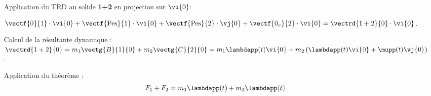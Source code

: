 \begin{corrigebox}
\vspace{.25cm}

Application du TRD au solide \textbf{1+2} en projection sur $\vi{0}$: 

$\vectf{0}{1}\cdot \vi{0} + \vectf{\text{Pes}}{1}\cdot \vi{0}+ \vectf{\text{Pes}}{2}\cdot \vj{0}+ \vectf{0_v}{2}\cdot \vi{0} = \vectrd{1+2}{0}\cdot \vi{0}$.

\vspace{.25cm}

Calcul de la résultante dynamique : 
$\vectrd{1+2}{0} = m_1 \vectg{B}{1}{0}+m_2 \vectg{C}{2}{0} = m_1 \lambdapp (t) \vi{0} + m_2 \left(\lambdapp (t) \vi{0}+\mupp (t) \vj{0}\right)$.

Application du théorème : 
$$
F_1  + F_2 = m_1 \lambdapp (t)  + m_2 \lambdapp (t) .
$$
\end{corrigebox}
